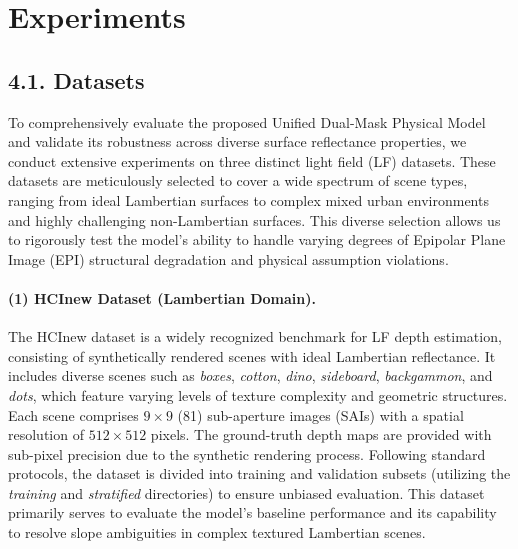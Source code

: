 \section{Experiments}

\subsection{4.1. Datasets}

To comprehensively evaluate the proposed Unified Dual-Mask Physical Model and validate its robustness across diverse surface reflectance properties, we conduct extensive experiments on three distinct light field (LF) datasets. These datasets are meticulously selected to cover a wide spectrum of scene types, ranging from ideal Lambertian surfaces to complex mixed urban environments and highly challenging non-Lambertian surfaces. This diverse selection allows us to rigorously test the model's ability to handle varying degrees of Epipolar Plane Image (EPI) structural degradation and physical assumption violations.

\paragraph{(1) HCInew Dataset (Lambertian Domain).}
The HCInew dataset is a widely recognized benchmark for LF depth estimation, consisting of synthetically rendered scenes with ideal Lambertian reflectance. It includes diverse scenes such as \textit{boxes}, \textit{cotton}, \textit{dino}, \textit{sideboard}, \textit{backgammon}, and \textit{dots}, which feature varying levels of texture complexity and geometric structures. Each scene comprises $9 \times 9$ (81) sub-aperture images (SAIs) with a spatial resolution of $512 \times 512$ pixels. The ground-truth depth maps are provided with sub-pixel precision due to the synthetic rendering process. Following standard protocols, the dataset is divided into training and validation subsets (utilizing the \textit{training} and \textit{stratified} directories) to ensure unbiased evaluation. This dataset primarily serves to evaluate the model's baseline performance and its capability to resolve slope ambiguities in complex textured Lambertian scenes.

